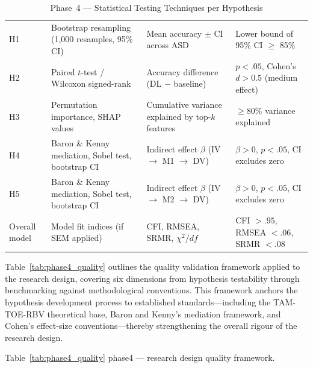 \begin{xltabular}{\textwidth}{@{} l l X X @{}}
\caption{Phase~4 --- Statistical Testing Techniques per Hypothesis}
\label{tab:phase4_statistics}\\
\toprule
{} &  &  &  \\
\midrule
\endfirsthead
\endhead
\bottomrule
\endlastfoot
H1 & Bootstrap resampling (1,000 resamples, 95\% CI)         & Mean accuracy $\pm$ CI across ASD               & Lower bound of 95\% CI $\geq$ 85\% \\
\addlinespace
H2 & Paired $t$-test / Wilcoxon signed-rank                  & Accuracy difference (DL $-$ baseline)                       & $p < .05$, Cohen's $d > 0.5$ (medium effect) \\
\addlinespace
H3 & Permutation importance, SHAP values                     & Cumulative variance explained by top-$k$ features     & $\geq$80\% variance explained \\
\addlinespace
H4 & Baron \& Kenny mediation, Sobel test, bootstrap CI      & Indirect effect $\beta$ (IV $\rightarrow$ M1 $\rightarrow$ DV) & $\beta > 0$, $p < .05$, CI excludes zero \\
\addlinespace
H5 & Baron \& Kenny mediation, Sobel test, bootstrap CI      & Indirect effect $\beta$ (IV $\rightarrow$ M2 $\rightarrow$ DV) & $\beta > 0$, $p < .05$, CI excludes zero \\
\addlinespace
Overall model & Model fit indices (if SEM applied)             & CFI, RMSEA, SRMR, $\chi^2/df$                         & CFI $> .95$, RMSEA $< .06$, SRMR $< .08$ \\
\end{xltabular}
\endgroup

\vspace{1.5em}

Table~\ref{tab:phase4_quality} outlines the quality validation framework applied to the research design, covering six dimensions from hypothesis testability through benchmarking against methodological conventions. This framework anchors the hypothesis development process to established standards---including the TAM-TOE-RBV theoretical base, Baron and Kenny's mediation framework, and Cohen's effect-size conventions---thereby strengthening the overall rigour of the research design.

\begingroup\singlespacing\tablefontsize\tablestripes
\noindent Table~\ref{tab:phase4_quality} phase4 --- research design quality framework.

